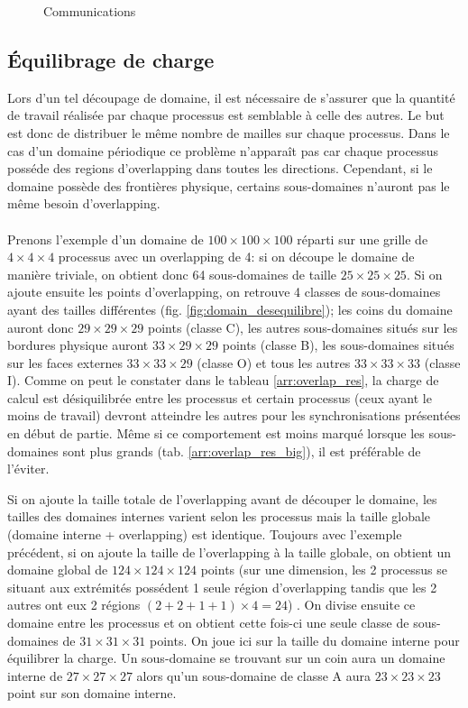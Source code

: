 \begin{figure}[h!]
\begin{subfigure}[b]{0.5\textwidth}
  \caption{\label{fig:comm_dim2}}
  \end{subfigure}
  \caption{\label{fig:comm}Communications}
\end{figure}


\subsection{Équilibrage de charge}
Lors d'un tel découpage de domaine, il est nécessaire de s'assurer que la quantité de travail réalisée par chaque processus est semblable à celle des autres. Le but est donc de distribuer le même nombre de mailles sur chaque processus. Dans le cas d'un domaine périodique ce problème n'apparaît pas car chaque processus posséde des regions d'overlapping dans toutes les directions. Cependant, si le domaine possède des frontières physique, certains sous-domaines n'auront pas le même besoin d'overlapping.

\paragraph{}Prenons l'exemple d'un domaine de $100\times100\times100$ réparti sur une grille de $4\times4\times4$ processus avec un overlapping de 4: si on découpe le domaine de manière triviale, on obtient donc 64 sous-domaines de taille $25\times25\times25$. Si on ajoute ensuite les points d'overlapping, on retrouve 4 classes de sous-domaines ayant des tailles différentes (fig. \ref{fig:domain_desequilibre}); les coins du domaine auront donc $29\times29\times29$ points (classe C), les autres sous-domaines situés sur les bordures physique auront $33\times29\times29$ points (classe B), les sous-domaines situés sur les faces externes $33\times33\times29$ (classe O) et tous les autres $33\times33\times33$ (classe I). Comme on peut le constater dans le tableau \ref{arr:overlap_res}, la charge de calcul est désiquilibrée entre les processus et certain processus (ceux ayant le moins de travail) devront atteindre les autres pour les synchronisations présentées en début de partie. Même si ce comportement est moins marqué lorsque les sous-domaines sont plus grands (tab. \ref{arr:overlap_res_big}), il est préférable de l'éviter.
  
Si on ajoute la taille totale de l'overlapping avant de découper le domaine, les tailles des domaines internes varient selon les processus mais la taille globale (domaine interne + overlapping) est identique. Toujours avec l'exemple précédent, si on ajoute la taille de l'overlapping à la taille globale, on obtient un domaine global de $124\times124\times124$ points (sur une dimension, les 2 processus se situant aux extrémités possédent 1 seule région d'overlapping tandis que les 2 autres ont eux 2 régions $(2+2+1+1)\times4=24$) . On divise ensuite ce domaine entre les processus et on obtient cette fois-ci une seule classe de sous-domaines de $31\times31\times31$ points. On joue ici sur la taille du domaine interne pour équilibrer la charge. Un sous-domaine se trouvant sur un coin aura un domaine interne de $27\times27\times27$ alors qu'un sous-domaine de classe A aura $23\times23\times23$ point sur son domaine interne.


